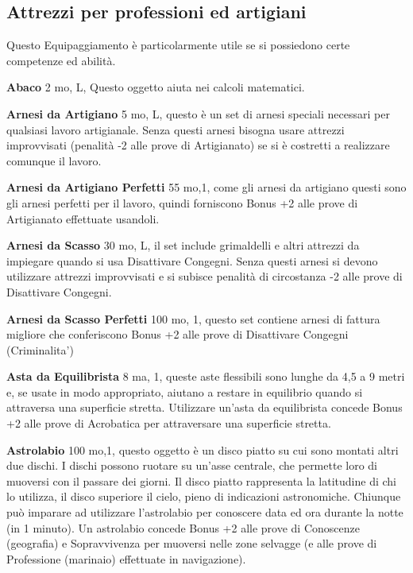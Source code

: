 \documentclass[a4paper,11pt,twoside,openany]{book}
\begin{document}
\pagebreak

\subsection{Attrezzi per professioni ed artigiani}

\label{attrezzi-per-professioni-ed-artigiani}

Questo Equipaggiamento è particolarmente utile se si possiedono certe competenze ed abilità.

\textbf{Abaco} 2 mo, L, Questo oggetto aiuta nei calcoli matematici.

\textbf{Arnesi da Artigiano} 5 mo, L, questo è un set di arnesi speciali necessari per qualsiasi lavoro artigianale. Senza questi arnesi bisogna usare attrezzi improvvisati (penalità -2 alle prove di Artigianato) se si è costretti a realizzare comunque il lavoro.

\textbf{Arnesi da Artigiano Perfetti} 55 mo,1, come gli arnesi da artigiano questi sono gli arnesi perfetti per il lavoro, quindi forniscono Bonus +2 alle prove di Artigianato effettuate usandoli.

\textbf{Arnesi da Scasso} 30 mo, L, il set include grimaldelli e altri attrezzi da impiegare quando si usa Disattivare Congegni. Senza questi arnesi si devono utilizzare attrezzi improvvisati e si subisce penalità di circostanza -2 alle prove di Disattivare Congegni.

\textbf{Arnesi da Scasso Perfetti} 100 mo, 1, questo set contiene arnesi di fattura migliore che conferiscono Bonus +2 alle prove di Disattivare Congegni (Criminalita')

\textbf{Asta da Equilibrista} 8 ma, 1, queste aste flessibili sono lunghe da 4,5 a 9 metri e, se usate in modo appropriato, aiutano a restare in equilibrio quando si attraversa una superficie stretta. Utilizzare un'asta da equilibrista concede Bonus +2 alle prove di Acrobatica per attraversare una superficie stretta.

\textbf{Astrolabio} 100 mo,1,  questo oggetto è un disco piatto su cui sono montati altri due dischi. I dischi possono ruotare su un'asse centrale, che permette loro di muoversi con il passare dei giorni. Il disco piatto rappresenta la latitudine di chi lo utilizza, il disco superiore il cielo, pieno di indicazioni astronomiche.
Chiunque può imparare ad utilizzare l'astrolabio per conoscere data ed ora durante la notte (in 1 minuto). Un astrolabio concede Bonus +2 alle prove di Conoscenze (geografia) e Sopravvivenza per muoversi nelle zone selvagge (e alle prove di Professione (marinaio) effettuate in navigazione).
\end{document}
